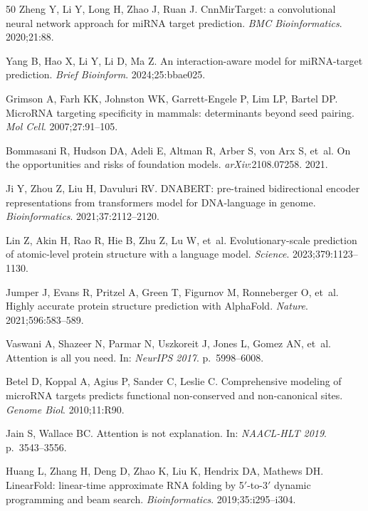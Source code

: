 \documentclass[sn-mathphys-num]{sn-jnl}
\begin{document}
\begin{thebibliography}{50}
Zheng Y, Li Y, Long H, Zhao J, Ruan J. CnnMirTarget: a convolutional neural network approach for miRNA target prediction. \textit{BMC Bioinformatics}. 2020;21:88.

Yang B, Hao X, Li Y, Li D, Ma Z. An interaction-aware model for miRNA-target prediction. \textit{Brief Bioinform}. 2024;25:bbae025.

Grimson A, Farh KK, Johnston WK, Garrett-Engele P, Lim LP, Bartel DP. MicroRNA targeting specificity in mammals: determinants beyond seed pairing. \textit{Mol Cell}. 2007;27:91--105.

Bommasani R, Hudson DA, Adeli E, Altman R, Arber S, von Arx S, et~al. On the opportunities and risks of foundation models. \textit{arXiv}:2108.07258. 2021.

Ji Y, Zhou Z, Liu H, Davuluri RV. DNABERT: pre-trained bidirectional encoder representations from transformers model for DNA-language in genome. \textit{Bioinformatics}. 2021;37:2112--2120.

Lin Z, Akin H, Rao R, Hie B, Zhu Z, Lu W, et~al. Evolutionary-scale prediction of atomic-level protein structure with a language model. \textit{Science}. 2023;379:1123--1130.

Jumper J, Evans R, Pritzel A, Green T, Figurnov M, Ronneberger O, et~al. Highly accurate protein structure prediction with AlphaFold. \textit{Nature}. 2021;596:583--589.

Vaswani A, Shazeer N, Parmar N, Uszkoreit J, Jones L, Gomez AN, et~al. Attention is all you need. In: \textit{NeurIPS 2017}. p.~5998--6008.

Betel D, Koppal A, Agius P, Sander C, Leslie C. Comprehensive modeling of microRNA targets predicts functional non-conserved and non-canonical sites. \textit{Genome Biol}. 2010;11:R90.

Jain S, Wallace BC. Attention is not explanation. In: \textit{NAACL-HLT 2019}. p.~3543--3556.

Huang L, Zhang H, Deng D, Zhao K, Liu K, Hendrix DA, Mathews DH. LinearFold: linear-time approximate RNA folding by 5$'$-to-3$'$ dynamic programming and beam search. \textit{Bioinformatics}. 2019;35:i295--i304.

\end{thebibliography}
\end{document}
